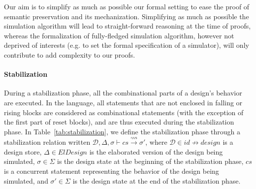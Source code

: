 \documentclass[pdflatex,sn-mathphys]{sn-jnl}%
\theoremstyle{thmstyleone}%
\theoremstyle{thmstyletwo}%
\theoremstyle{thmstylethree}%
\begin{document}
Our aim is to simplify as much as possible our formal setting to ease
the proof of semantic preservation and its mechanization. Simplifying
as much as possible the simulation algorithm will lead to
straight-forward reasoning at the time of proofs, whereas the
formalization of fully-fledged simulation algorithm, however not
deprived of interests (e.g. to set the formal specification of a
\vhdl{} simulator), will only contribute to add complexity to our
proofs.

\paragraph{Stabilization}

During a stabilization phase, all the combinational parts of a
design's behavior are executed. In the \hvhdl{} language, all
statements that are not enclosed in falling or rising blocks are
considered as combinational statements (with the exception of the
first part of reset blocks), and are thus executed during the
stabilization phase. In Table~\ref{tab:stabilization}, we define the
stabilization phase through a stabilization relation written
$\mathcal{D},\Delta,\sigma\vdash{}cs\xrightarrow{\rightsquigarrow}\sigma'$,
where $\mathcal{D}\in{}id\nrightarrow{}design$ is a design store,
$\Delta\in{}ElDesign$ is the elaborated version of the design being
simulated, $\sigma\in{}\Sigma$ is the design state at the beginning of
the stabilization phase, $cs$ is a concurrent statement representing
the behavior of the design being simulated, and $\sigma'\in\Sigma$ is
the design state at the end of the stabilization phase.
\end{document}
